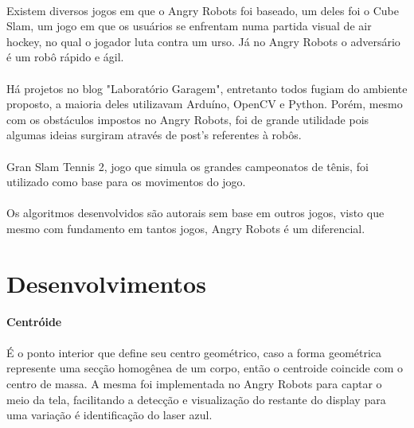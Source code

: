 \documentclass{sciposter}
\begin{document}
\begin{multicols}{3}
\paragraph{}Existem diversos jogos em que o Angry Robots foi baseado, um deles foi o Cube Slam, um jogo em que os usuários se enfrentam numa partida visual de air hockey, no qual o jogador luta contra um urso. Já no Angry Robots o adversário é um robô rápido e ágil.
\paragraph{}Há projetos no blog "Laboratório Garagem", entretanto todos fugiam do ambiente proposto, a maioria deles utilizavam Arduíno, OpenCV e Python. Porém, mesmo com os obstáculos impostos no Angry Robots, foi de grande utilidade pois algumas ideias surgiram através de post's referentes à robôs.
\paragraph{}Gran Slam Tennis 2, jogo que simula os grandes campeonatos de tênis, foi utilizado como base para os movimentos do jogo. 
\paragraph{}Os algoritmos desenvolvidos são autorais sem base em outros jogos, visto que mesmo com fundamento em tantos jogos, Angry Robots é um diferencial.

\section{Desenvolvimentos}

\textbf{Centróide} \\ \\ 
É o ponto interior que define seu centro geométrico, caso a forma geométrica represente uma secção homogênea de um corpo, então o centroide coincide com o centro de massa. A mesma foi implementada no Angry Robots para captar o meio da tela, facilitando a detecção e visualização do restante do display para uma variação é identificação do laser azul.


\end{multicols}
\end{document}
